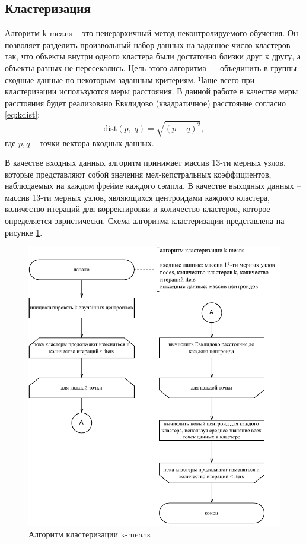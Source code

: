 \subsection{Кластеризация}

Алгоритм k-means -- это неиерархичный метод неконтролируемого обучения. Он позволяет разделить произвольный набор данных на заданное число кластеров так, что объекты внутри одного кластера были достаточно
близки друг к другу, а объекты разных не пересекались. Цель этого алгоритма — объединить в группы сходные данные по некоторым заданным критериям. Чаще всего при кластеризации используются меры расстояния. В данной работе в качестве меры расстояния будет реализовано Евклидово (квадратичное) расстояние согласно \ref{eq:kdist}:
\begin{equation}\label{eq:kdist}
	\mathrm{dist}(p,\;q) = \sqrt{(p - q)^2},
\end{equation}
где $p, q$ -- точки вектора входных данных.

В качестве входных данных алгоритм принимает массив 13-ти мерных узлов, которые представляют собой значения мел-кепстральных коэффициентов, наблюдаемых на каждом фрейме каждого сэмпла. В качестве выходных данных -- массив 13-ти мерных узлов, являющихся центроидами каждого кластера, количество итераций для корректировки и количество кластеров, которое определяется эвристически. Схема алгоритма кластеризации представлена на рисунке \ref{fig:kmeans}.

\begin{figure}[H]
	\centering
	\includegraphics[width=0.7\linewidth]{assets/kmeans-flowchart}
	\caption{Алгоритм кластеризации k-means}
	\label{fig:kmeans}
\end{figure}

